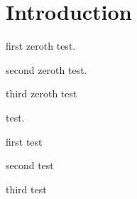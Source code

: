 \chapter{Introduction}
\label{ch:introduction}


first zeroth test. \supercite{Carpio_2020, Alvarez_2004, Jackson_1999}

second zeroth test. \supercite{Carpio_2020, Alvarez_2004}

third zeroth test \supercite{Carpio_2020, Jackson_1999}

test. \supercite{Li_2012}

first test \cite{Carpio_2020, Alvarez_2004, Jackson_1999}

second test \cite{Carpio_2020, Alvarez_2004}

third test \cite{Carpio_2020, Jackson_1999}

\cite{Thompson_1993}

\cite{Li_2012}

\cite{Haskell_2018}
